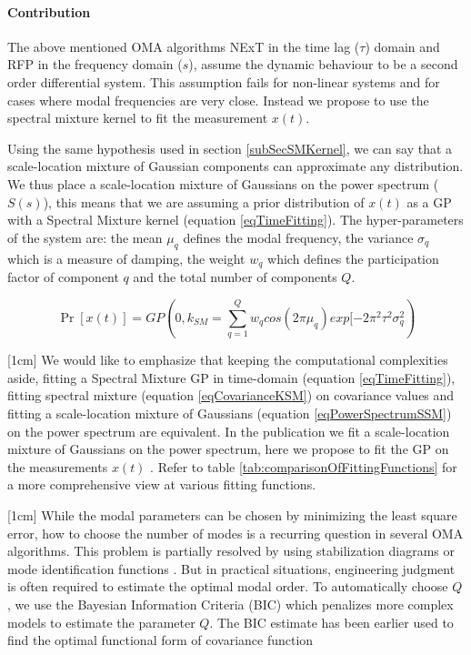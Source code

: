 \begin{mdframed}[hidealllines=true,backgroundcolor=blue!20]
\paragraph{Contribution}
The above mentioned OMA algorithms NExT in the time lag ($ \tau$) domain and RFP in the frequency domain ($s$), assume the dynamic behaviour to be a second order differential system. This assumption fails for non-linear systems and for cases where modal frequencies are very close. Instead we propose to use the spectral mixture kernel to fit the measurement $x(t)$. 

Using the same hypothesis used in section \ref{subSecSMKernel}, we can say that a scale-location mixture of Gaussian components can approximate any distribution. We thus place a scale-location mixture of Gaussians on the power spectrum ($S(s)$), this means that we are assuming a prior distribution of $x(t)$ as a GP with a Spectral Mixture kernel (equation \ref{eqTimeFitting}). The hyper-parameters of the system are: the mean $\mu_{q}$ defines the modal frequency, the variance $\sigma_{q}$ which is a measure of damping, the weight $w_{q}$ which defines the participation factor of component $q$ and the total number of components $Q$.

\begin{equation}\label{eqTimeFitting}
\Pr[x(t)] = GP(0, k_{SM} = \sum_{q=1}^{Q}w_{q}cos(2\pi\mu_{q}) exp[-2\pi^{2}\tau^{2}\sigma_{q}^2)
\end{equation}

[1cm]
\sloppy We would like to emphasize that keeping the computational complexities aside, fitting a Spectral Mixture GP in time-domain (equation \ref{eqTimeFitting}), fitting spectral mixture (equation \ref{eqCovarianceKSM}) on covariance values and fitting a scale-location mixture of Gaussians (equation \ref{eqPowerSpectrumSSM}) on the power spectrum are equivalent. In the publication \cite{chiplunkar2017operational} we fit a scale-location mixture of Gaussians on the power spectrum, here we propose to fit the GP on the measurements $x(t)$ . Refer to table \ref{tab:comparisonOfFittingFunctions} for a more comprehensive view at various fitting functions.

[1cm]
While the modal parameters can be chosen by minimizing the least square error, how to choose the number of modes is a recurring question in several OMA algorithms. This problem is partially resolved by using stabilization diagrams or mode identification functions \cite{allemang1998unified, williams1985multivariate, shih1988complex}. But in practical situations, engineering judgment is often required to estimate the optimal modal order. To automatically choose $Q$, we use the Bayesian Information Criteria (BIC) \cite{findley1991counterexamples} which penalizes more complex models to estimate the parameter $Q$. The BIC estimate has been earlier used to find the optimal functional form of covariance function \cite{duvenaud2013structure}


\end{mdframed}
